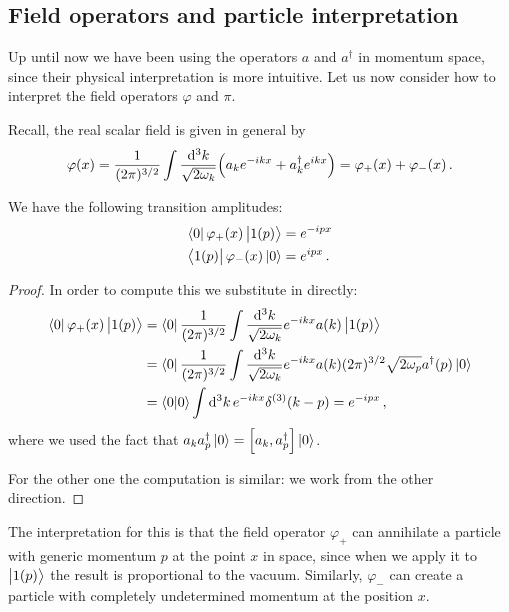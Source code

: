 \documentclass[main.tex]{subfiles}
\begin{document}
\subsection{Field operators and particle interpretation}

Up until now we have been using the operators \(a\) and \(a ^\dag\) in momentum space, since their physical interpretation is more intuitive. 
Let us now consider how to interpret the field operators \(\varphi \) and \(\pi \). 

Recall, the real scalar field is given in general by 
%
\begin{align}
\varphi (x) = \frac{1}{(2 \pi )^{3/2}} 
\int \frac{ \dd[3]{k}}{\sqrt{2 \omega_{k}}}
\qty( a_k e^{-ikx} + a ^\dag_{k} e^{ikx}) = \varphi_{+} (x) + \varphi_{-} (x)
\,.
\end{align}

\begin{claim}
We have the following transition amplitudes: 
%
\begin{align}
\bra{0} \varphi_{+} (x) \ket{1(p)} &= e^{-ipx} \\
\bra{1(p)} \varphi_{-} (x) \ket{0} &= e^{ipx}
\,.
\end{align}
\end{claim}

\begin{proof}
In order to compute this we substitute in directly:  
%
\begin{align}
\bra{0} \varphi_{+} (x) \ket{1(p)} &=
\bra{0} \frac{1}{(2 \pi )^{3/2}} 
\int \frac{ \dd[3]{k}}{\sqrt{2 \omega_{k}}} 
e^{-ikx} a(k) \ket{1(p)}  \\
&= \bra{0} \frac{1}{(2 \pi )^{3/2}} 
\int \frac{ \dd[3]{k}}{\sqrt{2 \omega_{k}}} 
e^{-ikx} a(k) (2 \pi )^{3/2} \sqrt{2 \omega_{p}} a ^\dag (p) \ket{0}  \\
&= \braket{0}{0} \int \dd[3]{k} e^{-ikx} \delta^{(3)} (k-p) = e^{-ipx}
\,,
\end{align}
%
where we used the fact that \(a_k a ^\dag_p \ket{0} = \qty[a_k, a ^\dag_p] \ket{0}\).

For the other one the computation is similar: we work from the other direction.
\end{proof}

The interpretation for this is that the field operator \(\varphi_{+}\) can annihilate a particle with generic momentum \(p\) at the point \(x\) in space, since when we apply it to \(\ket{1(p)}\) the result is proportional to the vacuum. Similarly, \(\varphi_{-}\) can create a particle with completely undetermined momentum at the position \(x\). 
\end{document}
